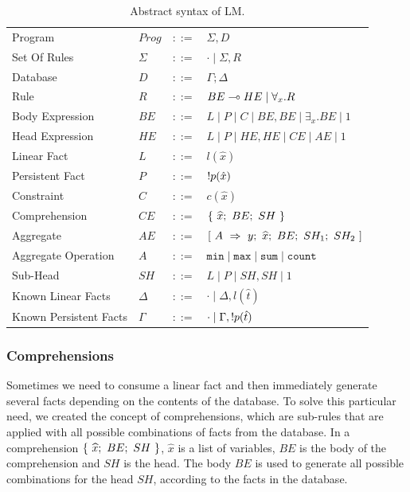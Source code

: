 \renewcommand{\arraystretch}{1.2}
\begin{table}[h]
\centering
\begin{tabular}{ l l c l }
  Program & $Prog$ & $::=$ & $\Sigma, D$ \\
  Set Of Rules & $\Sigma$ & $::=$ & $\cdot \; | \; \Sigma, R$\\
  Database & $D$ & $::=$ & $\Gamma; \Delta$ \\
  Rule & $R$ & $::=$ & $BE \multimap HE \; | \; \forall_{x}. R$ \\
  Body Expression & $BE$ & $::=$ & $L \; | \; P \; | \; C \; | \; BE, BE \; | \; \exists_{x}. BE \; | \; 1$\\
  Head Expression & $HE$ & $::=$ & $L \; | \; P \; | \; HE, HE \; | \; CE \; | \; AE \; | \; 1$\\
  
  Linear Fact & $L$ & $::=$ & $l(\hat{x})$\\
  Persistent Fact & $P$ & $::=$ & ${!} p(\hat{x})$\\
  Constraint & $C$ & $::=$ & $c(\hat{x})$ \\
  
  Comprehension & $CE$ & $::=$ & $\{~\widehat{x};~BE;~SH~\}$ \\
  Aggregate & $AE$ & $::=$ & $[~A~\Rightarrow~y;~\widehat{x};~BE;~SH_1;~SH_2~]$ \\
  Aggregate Operation & $A$ & $::=$ & $\mathtt{min} \; | \; \mathtt{max} \; | \; \mathtt{sum} \; | \; \mathtt{count}$ \\
  
  Sub-Head & $SH$ & $::=$ & $L \; | \; P \; | \; SH, SH \; | \; 1$\\
  
  Known Linear Facts & $\Delta$ & $::=$ & $\cdot \; | \; \Delta, l(\hat{t})$ \\
  Known Persistent Facts & $\Gamma$ & $::=$ & $\cdot \; | \; \Gamma, {!} p(\hat{t})$ \\
\end{tabular}
\vspace{0.5\intextsep}
\caption{Abstract syntax of LM.}
\label{tbl:ast}
\vspace{-1\intextsep}
\end{table}
\renewcommand{\arraystretch}{1.0}

\subsubsection{Comprehensions}

Sometimes we need to consume a linear fact and then immediately generate several facts depending on
the contents of the database. To solve this particular need, we created the concept of comprehensions, which are
sub-rules that are applied with all possible combinations of facts from the database. In a comprehension $\{~\widehat{x};~BE;~SH~\}$,
$\widehat{x}$ is a list of variables, $BE$ is the body of the comprehension and $SH$ is the head.
The body $BE$ is used to generate all possible combinations for the head $SH$, according to the facts
in the database.

